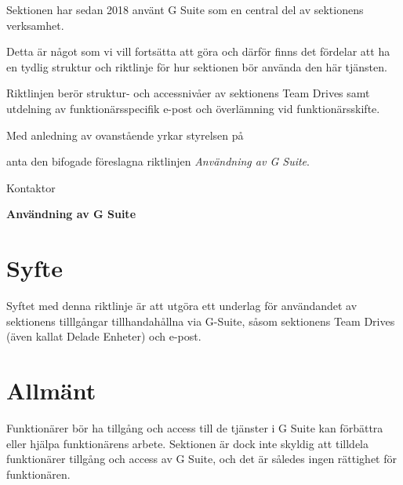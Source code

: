 \documentclass[../_main/handlingar.tex]{subfiles}
\begin{document}

Sektionen har sedan 2018 använt G Suite som en central del av sektionens verksamhet. 

Detta är något som vi vill fortsätta att göra och därför finns det fördelar att ha en tydlig struktur och riktlinje för hur sektionen bör använda den här tjänsten. 

Riktlinjen berör struktur- och accessnivåer av sektionens Team Drives samt utdelning av funktionärsspecifik e-post och överlämning vid funktionärsskifte. 

\vspace{10px}

Med anledning av ovanstående yrkar styrelsen på

\begin{attsatser}
    
    \att anta den bifogade föreslagna riktlinjen \textit{Användning av G Suite}. 

\end{attsatser}

\begin{signatures}{1}
    \ist
    \signature{Mattias Lundström}{Kontaktor}
\end{signatures}

{\Large \textbf{Användning av G Suite}}
    \vspace{6px}

    \section{Syfte}
    \vspace{6px}
    
    Syftet med denna riktlinje är att utgöra ett underlag för användandet av sektionens tilllgångar tillhandahållna via G-Suite, såsom sektionens Team Drives (även kallat Delade Enheter) och e-post. 
    
    \vspace{6px}
    \section{Allmänt}
    \vspace{6px}

    Funktionärer bör ha tillgång och access till de tjänster i G Suite kan förbättra eller hjälpa funktionärens arbete. 
    Sektionen är dock inte skyldig att tilldela funktionärer tillgång och access av G Suite, och det är således ingen rättighet för funktionären. 
 
\end{document}

